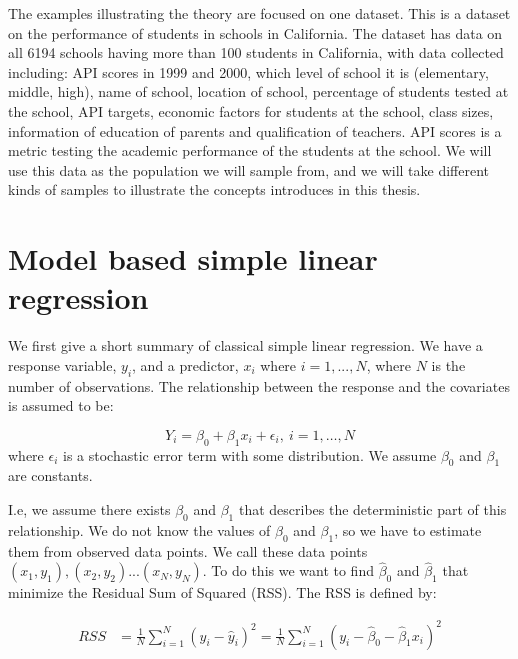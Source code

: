 \documentclass{article}
\begin{document}
The examples illustrating the theory are focused on one dataset. This is a dataset on the performance of students in schools in
California. The dataset has data on all 6194 schools having more than 100
students in California, with data collected
including: API scores in 1999 and 2000, which level of school it is
(elementary, middle, high), name of school, location of school, percentage of
students tested at the school, API targets, economic factors for students at the
school, class sizes, information of education of parents and qualification of teachers.
API scores is a metric testing the academic performance of the students at the school.
We will use this data as the population we will sample from, and we will take
different kinds of samples to illustrate the concepts introduces in this thesis.


\section{Model based simple linear regression} \label{sec:modLinReg}

We first give a short summary of classical simple linear regression. We have a response variable, \(y_i\), and a predictor,
\(x_i\) where \(i = 1, ..., N\), where \(N\) is the number of observations. The
relationship between the response and the covariates is assumed to be:

\begin{equation*}
Y_i = \beta_0 + \beta_1 x_i + \epsilon_i,\ i = 1, \dots, N
\end{equation*}
where \(\epsilon_i\) is a stochastic error term with some distribution. We
assume \(\beta_0\) and \(\beta_1\) are constants.

I.e, we assume there exists \(\beta_0\) and \(\beta_1\) that describes the
deterministic part of this relationship.
We do not know the values of \(\beta_0\) and \(\beta_1\), so we have to estimate them from observed data points. We call these data points \((x_1, y_1), (x_2, y_2)
... (x_N, y_N)\). To do
this we want to find \(\hat{\beta}_0\) and \(\hat{\beta}_1\) that minimize the
Residual Sum of Squared (RSS). The RSS is defined by:

\begin{align*}
  RSS &= \frac{1}{N} \sum_{i = 1}^N \left( y_i - \hat{y}_i \right)^2 
  = \frac{1}{N} \sum_{i = 1}^N \left( y_i - \hat{\beta}_0 - \hat{\beta}_1 x_i \right)^2
\end{align*}
\end{document}
